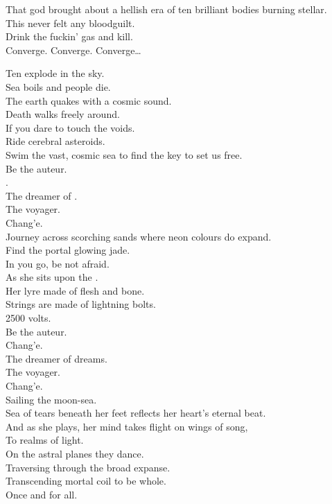 That god brought about a hellish era of ten brilliant bodies burning stellar. \\
This  never felt any bloodguilt. \\
Drink the fuckin' gas and kill. \\

Converge. Converge. Converge… \\



Ten  explode in the sky. \\
Sea boils and people die. \\
The earth quakes with a cosmic sound. \\
Death walks freely around. \\
If you dare to touch the voids. \\
Ride cerebral asteroids. \\
Swim the vast, cosmic sea to find the key to set us free. \\

Be the auteur. \\
. \\
The dreamer of . \\
The voyager. \\
Chang'e. \\

Journey across scorching sands where neon colours do expand. \\
Find the portal glowing jade. \\
In you go, be not afraid. \\
As she sits upon the . \\
Her lyre made of flesh and bone. \\
Strings are made of lightning bolts. \\
2500 volts. \\

Be the auteur. \\
Chang'e. \\
The dreamer of dreams. \\
The voyager. \\
Chang'e. \\
Sailing the moon-sea. \\

Sea of tears beneath her feet reflects her heart's eternal beat. \\
And as she plays, her mind takes flight on wings of song, \\
To realms of light. \\
On the astral planes they dance. \\
Traversing through the broad expanse. \\
Transcending mortal coil to be whole. \\
Once and for all. \\


